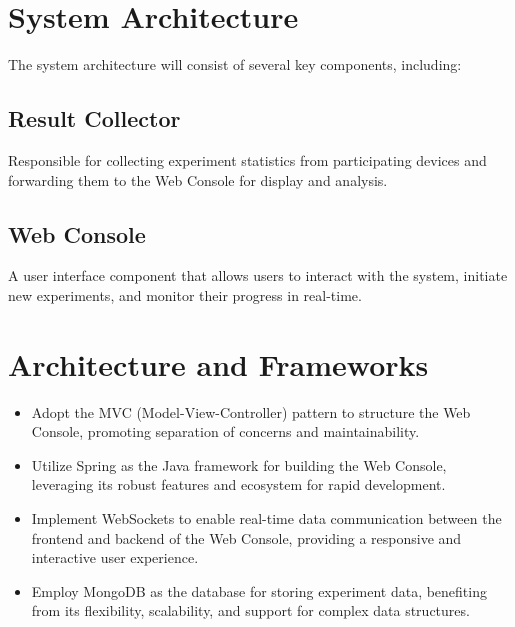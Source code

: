 \section{System Architecture}

The system architecture will consist of several key components, including:

\subsection{Result Collector}

Responsible for collecting experiment statistics from participating devices and forwarding them to the Web Console for display and analysis.

\subsection{Web Console}

A user interface component that allows users to interact with the system, initiate new experiments, and monitor their progress in real-time.

\section{Architecture and Frameworks}

\begin{itemize}
    \item Adopt the MVC (Model-View-Controller) pattern to structure the Web Console, promoting separation of concerns and maintainability.
    \item Utilize Spring as the Java framework for building the Web Console, leveraging its robust features and ecosystem for rapid development.
    \item Implement WebSockets to enable real-time data communication between the frontend and backend of the Web Console, providing a responsive and interactive user experience.
    \item Employ MongoDB as the database for storing experiment data, benefiting from its flexibility, scalability, and support for complex data structures.
\end{itemize}
